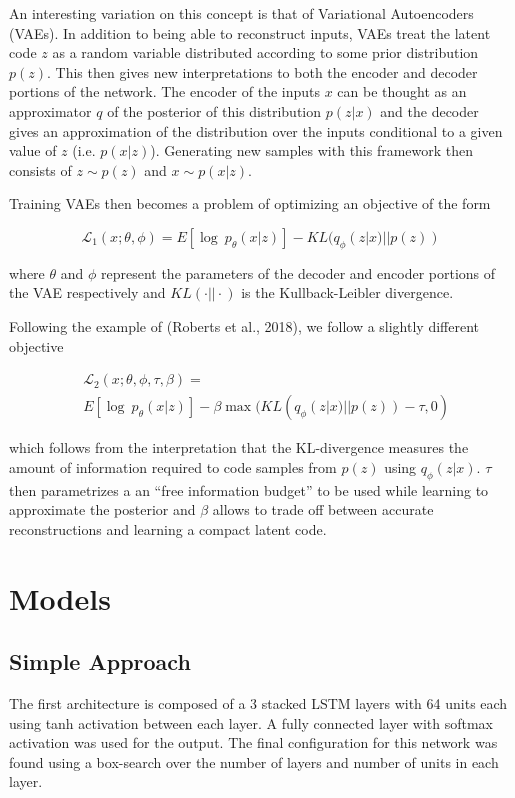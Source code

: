 \documentclass[10pt,twocolumn]{article}
\begin{document}
An interesting variation on this concept is that of Variational Autoencoders (VAEs). In addition to being able to reconstruct inputs, VAEs treat the latent code $z$ as a random variable distributed according to some prior distribution $p(z)$. This then gives new interpretations to both the encoder and decoder portions of the network. The encoder of the inputs $x$ can be thought as an approximator $q$ of the posterior of this distribution $p(z | x)$ and the decoder gives an approximation of the distribution over the inputs conditional to a given value of $z$ (i.e. $p(x | z)$). Generating new samples with this framework then consists of $z \sim p(z)$ and $x \sim p(x | z)$.

Training VAEs then becomes a problem of optimizing an objective of the form 

\[
  \mathcal{L}_1(x; \theta, \phi) = E[\log ~ p_\theta (x | z)] - KL(q_\phi(z | x) || p(z))
\]

where $\theta$ and $\phi$ represent the parameters of the decoder and encoder portions of the VAE respectively and $KL(\cdot || \cdot)$ is the Kullback-Leibler divergence.

Following the example of (Roberts et al., 2018), we follow a slightly different objective 

\begin{align*}
  & \mathcal{L}_2(x; \theta, \phi, \tau, \beta) = \\
   & E[\log ~ p_\theta (x | z)] - \beta \max(KL(q_\phi(z | x) || p(z)) - \tau, 0)
\end{align*}

which follows from the interpretation that the KL-divergence measures the amount of information required to code samples from $p(z)$ using $q_\phi(z | x)$. $\tau$ then parametrizes a an ``free information budget'' to be used while learning to approximate the posterior and $\beta$ allows to trade off between accurate reconstructions and learning a compact latent code.

\section{Models}
\subsection{Simple Approach}
 The first architecture is composed of a 3 stacked LSTM layers with 64 units each using tanh activation between each layer. A fully connected layer with softmax activation was used for the output. The final configuration for this network was found using a box-search over the number of layers and number of units in each layer.
\end{document}
